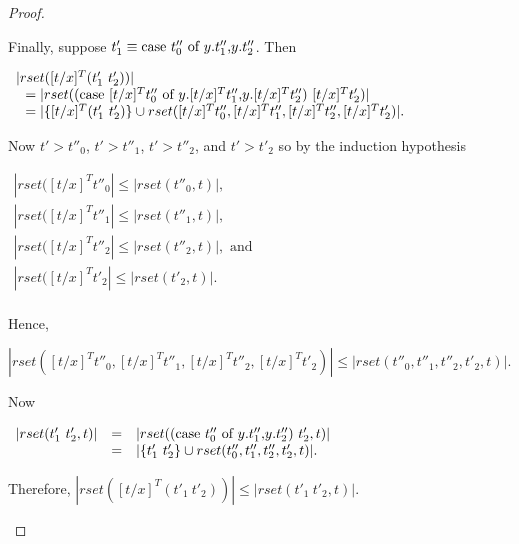 \begin{proof}
\begin{itemize}
  Finally, suppose $t'_1 \equiv \mbox{case}\ t''_0\ \text{of}\ y\text{.}t''_1\text{,}y\text{.}t''_2$.  Then
  \begin{center}
    \begin{math}
      \begin{array}{lll}
        |rset([t/x]^T (t'_1\ t'_2))| \\
        \,\,\,\,= |rset((\mbox{case}\ [t/x]^T t''_0\ \text{of}\ y\text{.}[t/x]^T t''_1\text{,}y\text{.}[t/x]^T t''_2)\ [t/x]^T t'_2)|\\
        \,\,\,\,= |\{[t/x]^T (t'_1\ t'_2)\} \cup rset([t/x]^T t''_0,[t/x]^T t''_1,[t/x]^T t''_2,[t/x]^T t'_2)|.
      \end{array}
    \end{math}
  \end{center}
  Now $t' > t''_0$, $t' > t''_1$, $t' > t''_2$, and $t' > t'_2$ so by the induction hypothesis
  \begin{center}
    \begin{math}
      \begin{array}{lll}
        |rset([t/x]^T t''_0| \leq |rset(t''_0, t)|,\\
        |rset([t/x]^T t''_1| \leq |rset(t''_1, t)|,\\
        |rset([t/x]^T t''_2| \leq |rset(t''_2, t)|, \text{ and }\\
        |rset([t/x]^T t'_2| \leq |rset(t'_2, t)|.\\
      \end{array}
    \end{math}
  \end{center}
  Hence, 
  \begin{center}
    \begin{math}
      |rset([t/x]^T t''_0,[t/x]^T t''_1,[t/x]^T t''_2,[t/x]^T t'_2)| \leq |rset(t''_0, t''_1, t''_2, t'_2, t)|.
    \end{math}
  \end{center}
  Now
  \begin{center}
    \begin{math}
      \begin{array}{lll}
        |rset(t'_1\ t'_2,t)| & = & |rset((\mbox{case}\ t''_0\ \text{of}\ y\text{.}t''_1\text{,}y\text{.}t''_2)\ t'_2,t)|\\
        & = & |\{t'_1\ t'_2\} \cup rset(t''_0, t''_1, t''_2, t'_2, t)|.
      \end{array}
    \end{math}
  \end{center}
  Therefore, $|rset([t/x]^T (t'_1\ t'_2))| \leq |rset(t'_1\ t'_2,t)|$.
  

\end{itemize}
\end{proof}
